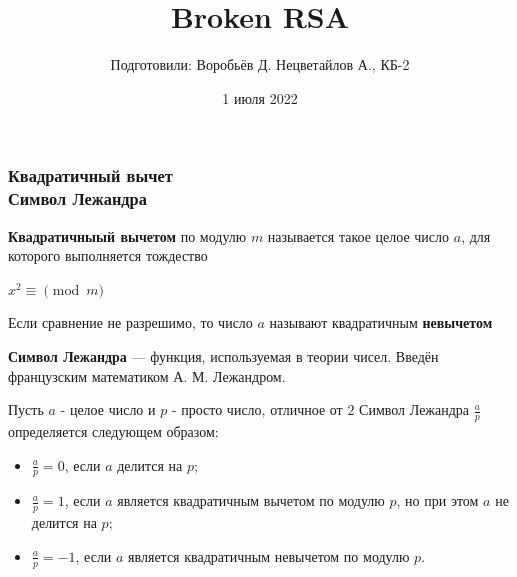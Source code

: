 \documentclass[8pt]{beamer}
\title {Broken RSA}
\author {Подготовили: Воробьёв Д.	Нецветайлов А., КБ-2}
\institute{Балтийский Федеральный университет им. Иманнуила Канта, Калининград}
\date[1 июля 2022]{1 июля 2022}
\begin{document}
\frame[plain]{\titlepage}	


\begin{frame}
	\begin{block}
	{
		\frametitle{Квадратичный вычет \\ Символ Лежандра}
		\textbf{Квадратичныый вычетом} по модулю $m$ называется такое целое число $a$, для которого выполняется тождество
	
		$x^2 \equiv \pmod m$
	
		Если сравнение не разрешимо, то число $a$ называют квадратичным \textbf{невычетом}}
	\end{block}
	
	\begin{block}
	{
		\textbf{Символ Лежандра} — функция, используемая в теории чисел. Введён французским математиком А. М. Лежандром.
	
		Пусть $a$ - целое число и $p$ - просто число, отличное от $2$ Символ Лежандра $\frac{a}{p}$ определяется следующем образом:
		\begin{itemize}
		\item $\frac{a}{p} = 0$, если $a$ делится на $p$;
	
		\item $\frac{a}{p} = 1$, если $a$ является квадратичным вычетом по модулю $p$, но при этом $a$ не делится на $p$;
	
		\item $\frac{a}{p} = -1$, если $a$ является квадратичным невычетом по модулю $p$.
		\end{itemize}
	}
	\end{block}
\end{frame}
\end{document}

